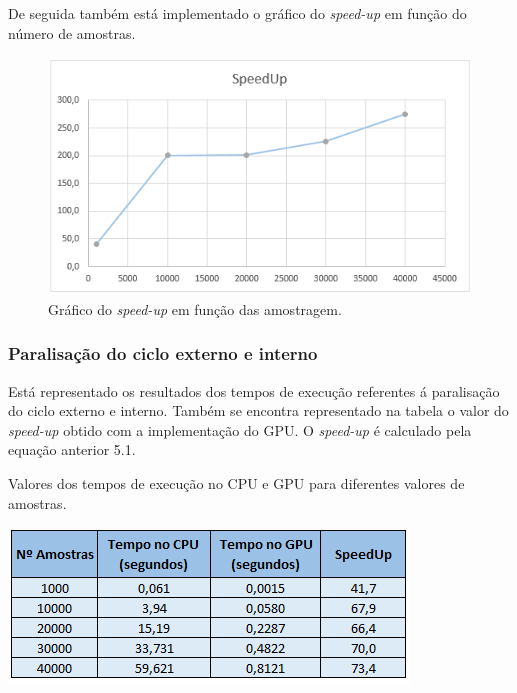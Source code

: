 \documentclass[11pt]{article}
\numberwithin{equation}{section}
\begin{document}
De seguida também está implementado o gráfico do \textit{speed-up} em função do número de amostras.
\begin{figure}[H]
	\centering
	\includegraphics[keepaspectratio=true, scale=0.6]{graficodospeedup}
	\vspace{-0.5em}
	\caption{Gráfico do \textit{speed-up} em função das amostragem.}
	\vspace{-0.8em}
	\label{fig:imag of i}
\end{figure} 

\subsubsection{Paralisação do ciclo externo e interno}
 Está representado os resultados dos tempos de execução referentes á paralisação do ciclo externo e interno. Também se encontra representado  na tabela o valor do \textit{speed-up} obtido com a implementação do GPU.
 O \textit{speed-up} é calculado pela equação anterior 5.1.
 
 \begin{table}[H]
 	\centering
 	\caption{Valores dos tempos de execução no CPU e GPU para diferentes valores de amostras.}
 	\vspace{-1.5mm}
 	\includegraphics[keepaspectratio=true, scale=0.8]{speedup2}
 \end{table}
 
\end{document}
